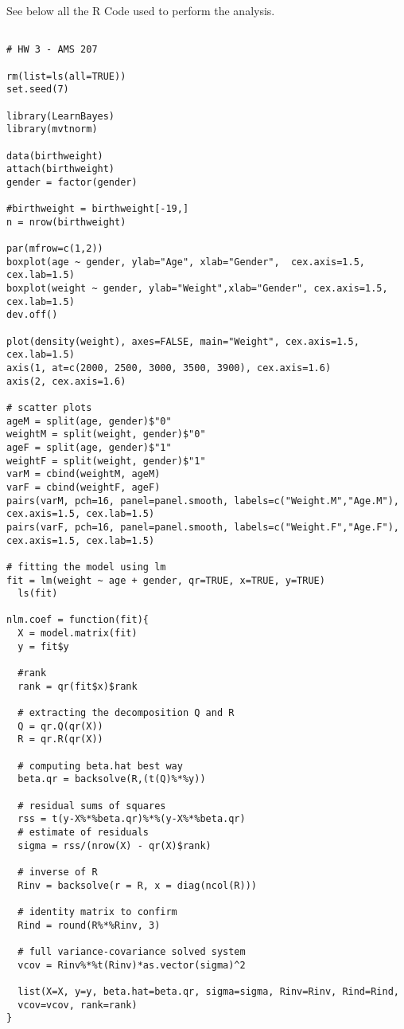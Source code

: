 \documentclass[a4paper, 11pt]{article}
\begin{document}
See below all the R Code used to perform the analysis.

\begin{verbatim}

# HW 3 - AMS 207

rm(list=ls(all=TRUE))
set.seed(7)

library(LearnBayes)
library(mvtnorm)

data(birthweight)
attach(birthweight)
gender = factor(gender)

#birthweight = birthweight[-19,]
n = nrow(birthweight)

par(mfrow=c(1,2))
boxplot(age ~ gender, ylab="Age", xlab="Gender",  cex.axis=1.5, cex.lab=1.5)
boxplot(weight ~ gender, ylab="Weight",xlab="Gender", cex.axis=1.5, cex.lab=1.5)
dev.off()

plot(density(weight), axes=FALSE, main="Weight", cex.axis=1.5, cex.lab=1.5)
axis(1, at=c(2000, 2500, 3000, 3500, 3900), cex.axis=1.6)
axis(2, cex.axis=1.6)

# scatter plots
ageM = split(age, gender)$"0"
weightM = split(weight, gender)$"0"
ageF = split(age, gender)$"1"
weightF = split(weight, gender)$"1"
varM = cbind(weightM, ageM)
varF = cbind(weightF, ageF)
pairs(varM, pch=16, panel=panel.smooth, labels=c("Weight.M","Age.M"), 
cex.axis=1.5, cex.lab=1.5)
pairs(varF, pch=16, panel=panel.smooth, labels=c("Weight.F","Age.F"), 
cex.axis=1.5, cex.lab=1.5)

# fitting the model using lm
fit = lm(weight ~ age + gender, qr=TRUE, x=TRUE, y=TRUE)
  ls(fit)

nlm.coef = function(fit){
  X = model.matrix(fit)
  y = fit$y
  
  #rank 
  rank = qr(fit$x)$rank
  
  # extracting the decomposition Q and R
  Q = qr.Q(qr(X))
  R = qr.R(qr(X))
  
  # computing beta.hat best way
  beta.qr = backsolve(R,(t(Q)%*%y))
  
  # residual sums of squares
  rss = t(y-X%*%beta.qr)%*%(y-X%*%beta.qr)
  # estimate of residuals
  sigma = rss/(nrow(X) - qr(X)$rank) 
  
  # inverse of R
  Rinv = backsolve(r = R, x = diag(ncol(R)))
  
  # identity matrix to confirm
  Rind = round(R%*%Rinv, 3)
  
  # full variance-covariance solved system
  vcov = Rinv%*%t(Rinv)*as.vector(sigma)^2
  
  list(X=X, y=y, beta.hat=beta.qr, sigma=sigma, Rinv=Rinv, Rind=Rind, 
  vcov=vcov, rank=rank)
}


\end{verbatim}
\end{document}
